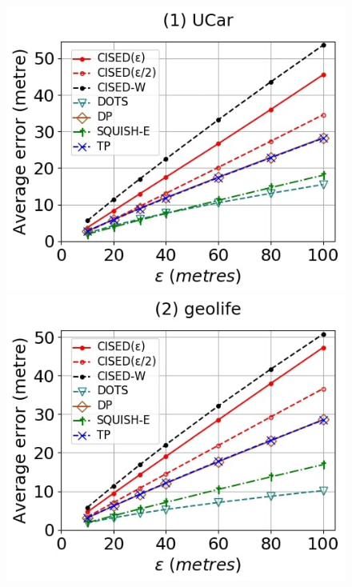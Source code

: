 {\begin{figure}[tb!]
	\centering
	\includegraphics[scale = 0.250]{Figures/Exp-where-SED-error-epsilon-service.jpg}\hspace{0.5ex}
	\includegraphics[scale = 0.250]{Figures/Exp-where-SED-error-epsilon-geolife.jpg}\hspace{0.5ex}

\end{figure}}
